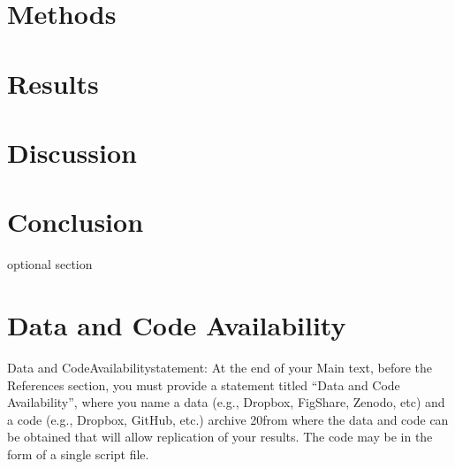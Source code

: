 \documentclass[11pt, a4paper, titlepage]{article}
\begin{document}
    \section*{Methods}


	

	\clearpage

	 \section*{Results}

    \clearpage
    
     \section*{Discussion}
     
     \clearpage
     
     \section*{Conclusion }
     optional section
     \clearpage
    
    \section*{Data and Code Availability}
    Data  and  CodeAvailabilitystatement:  At  the  end  of  your  Main  text,  before  the  References section, you must provide a statement titled “Data and Code Availability”, where you name a data (e.g., Dropbox, FigShare, Zenodo, etc) and a code (e.g., Dropbox, GitHub, etc.) archive 
    20from where the data and code can be obtained that will allow replication of your results. The code may be in the form of a single script file.
    
    \clearpage
    

    
\end{document}

